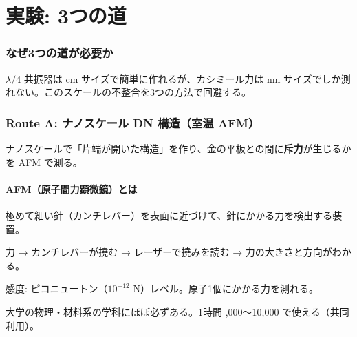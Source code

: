 \documentclass[12pt,a4paper]{article}
\begin{document}
\part{実験: 3つの道}

\section{なぜ3つの道が必要か}

$\lambda/4$ 共振器は cm サイズで簡単に作れるが、カシミール力は nm サイズでしか測れない。このスケールの不整合を3つの方法で回避する。

\section{Route A: ナノスケール DN 構造（室温 AFM）}

\begin{storybox}[何をするか（一言）]
ナノスケールで「片端が開いた構造」を作り、金の平板との間に\textbf{斥力}が生じるかを AFM で測る。
\end{storybox}

\subsection{AFM（原子間力顕微鏡）とは}
\begin{storybox}
極めて細い針（カンチレバー）を表面に近づけて、針にかかる力を検出する装置。

力 → カンチレバーが撓む → レーザーで撓みを読む → 力の大きさと方向がわかる。

感度: ピコニュートン（$10^{-12}$ N）レベル。原子1個にかかる力を測れる。

大学の物理・材料系の学科にほぼ必ずある。1時間 ,000〜10,000 で使える（共同利用）。
\end{storybox}
\end{document}
